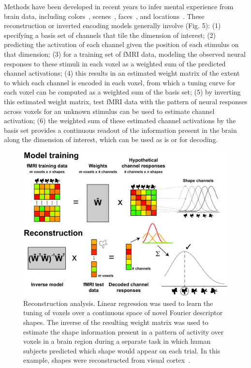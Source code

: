 Methods have been developed in recent years to infer
mental experience from brain data, including
colors~\citep{Brouwer:2009}, scenes~\citep{Naselaris:2009},
faces~\citep{Cowen:2014}, and locations~\citep{Sprague:2016}. These 
reconstruction or inverted encoding models generally
involve (Fig. 5): (1) specifying a basis set of channels that tile the
dimension of interest; (2) predicting the activation of each
channel given the position of each stimulus on that dimension; 
(3) for a training set of fMRI data, modeling the observed neural 
responses to these stimuli in each voxel as a weighted
sum of the predicted channel activations; (4) this results in an
estimated weight matrix of the extent to which each channel is encoded
in each voxel, from which a tuning curve for each voxel can be
computed as a weighted sum of the basis set; (5) by inverting this
estimated weight matrix, test fMRI data with the pattern of neural
responses across voxels for an unknown stimulus can be used to
estimate channel activation; (6) the weighted sum of these estimated
channel activations by the basis set provides a continuous readout of
the information present in the brain along the dimension of interest,
which can be used as is or for decoding.

\setlength{\columnsep}{20pt}
\begin{figure}
\centering
\includegraphics[width=.48\textwidth]{figs/inverse}
\caption{\small Reconstruction analysis. Linear regression was
used to learn the tuning of voxels over a continuous space of novel
Fourier descriptor shapes. The inverse of the resulting weight matrix
was used to estimate the shape information present in a pattern of
activity over voxels in a brain region during a separate task in which
human subjects predicted which shape would appear on each trial.
In this example, shapes were reconstructed from visual cortex~\citep{Kok:2018}.}
    \label{fig:hippo}
    \vskip2pt
\end{figure}

